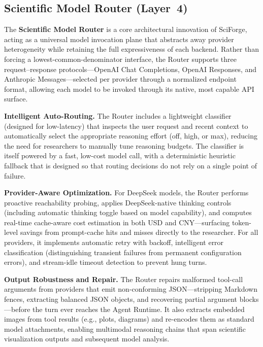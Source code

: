 \documentclass[sn-basic,Numbered,pdflatex]{sn-jnl}
\begin{document}
\subsection{Scientific Model Router (Layer~4)}
The \textbf{Scientific Model Router} is a core architectural innovation of SciForge, acting as a universal model invocation plane that abstracts away provider heterogeneity while retaining the full expressiveness of each backend. Rather than forcing a lowest-common-denominator interface, the Router supports three request--response protocols---OpenAI Chat Completions, OpenAI Responses, and Anthropic Messages---selected per provider through a normalized endpoint format, allowing each model to be invoked through its native, most capable API surface.

\textbf{Intelligent Auto-Routing.} The Router includes a lightweight classifier (designed for low-latency) that inspects the user request and recent context to automatically select the appropriate reasoning effort (off, high, or max), reducing the need for researchers to manually tune reasoning budgets. The classifier is itself powered by a fast, low-cost model call, with a deterministic heuristic fallback that is designed so that routing decisions do not rely on a single point of failure.

\textbf{Provider-Aware Optimization.} For DeepSeek models, the Router performs proactive reachability probing, applies DeepSeek-native thinking controls (including automatic thinking toggle based on model capability), and computes real-time cache-aware cost estimation in both USD and CNY---surfacing token-level savings from prompt-cache hits and misses directly to the researcher. For all providers, it implements automatic retry with backoff, intelligent error classification (distinguishing transient failures from permanent configuration errors), and stream-idle timeout detection to prevent hung turns.

\textbf{Output Robustness and Repair.} The Router repairs malformed tool-call arguments from providers that emit non-conforming JSON---stripping Markdown fences, extracting balanced JSON objects, and recovering partial argument blocks---before the turn ever reaches the Agent Runtime. It also extracts embedded images from tool results (e.g., plots, diagrams) and re-encodes them as standard model attachments, enabling multimodal reasoning chains that span scientific visualization outputs and subsequent model analysis.
\end{document}
